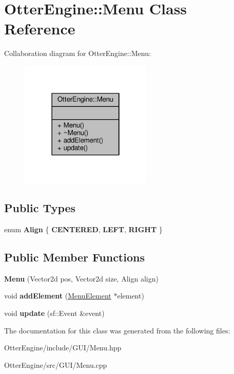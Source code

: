 \hypertarget{class_otter_engine_1_1_menu}{}\section{Otter\+Engine\+:\+:Menu Class Reference}
\label{class_otter_engine_1_1_menu}


Collaboration diagram for Otter\+Engine\+:\+:Menu\+:\nopagebreak
\begin{figure}[H]
\begin{center}
\leavevmode
\includegraphics[width=178pt]{d9/d88/class_otter_engine_1_1_menu__coll__graph}
\end{center}
\end{figure}
\subsection*{Public Types}
\begin{DoxyCompactItemize}
\item 
enum {\bfseries Align} \{ {\bfseries C\+E\+N\+T\+E\+R\+ED}, 
{\bfseries L\+E\+FT}, 
{\bfseries R\+I\+G\+HT}
 \}\hypertarget{class_otter_engine_1_1_menu_a9db03a8192e641a08e5a8bf2c35e07bc}{}\label{class_otter_engine_1_1_menu_a9db03a8192e641a08e5a8bf2c35e07bc}

\end{DoxyCompactItemize}
\subsection*{Public Member Functions}
\begin{DoxyCompactItemize}
\item 
{\bfseries Menu} (Vector2d pos, Vector2d size, Align align)\hypertarget{class_otter_engine_1_1_menu_a6ca9b7c1dd94caa1d09772ca7b6ca348}{}\label{class_otter_engine_1_1_menu_a6ca9b7c1dd94caa1d09772ca7b6ca348}

\item 
void {\bfseries add\+Element} (\hyperlink{class_otter_engine_1_1_menu_element}{Menu\+Element} $\ast$element)\hypertarget{class_otter_engine_1_1_menu_abc40cb330454eabc009efc150f4dce09}{}\label{class_otter_engine_1_1_menu_abc40cb330454eabc009efc150f4dce09}

\item 
void {\bfseries update} (sf\+::\+Event \&event)\hypertarget{class_otter_engine_1_1_menu_ad08576f05184eaff2450e3067891cdb4}{}\label{class_otter_engine_1_1_menu_ad08576f05184eaff2450e3067891cdb4}

\end{DoxyCompactItemize}


The documentation for this class was generated from the following files\+:\begin{DoxyCompactItemize}
\item 
Otter\+Engine/include/\+G\+U\+I/Menu.\+hpp\item 
Otter\+Engine/src/\+G\+U\+I/Menu.\+cpp\end{DoxyCompactItemize}
